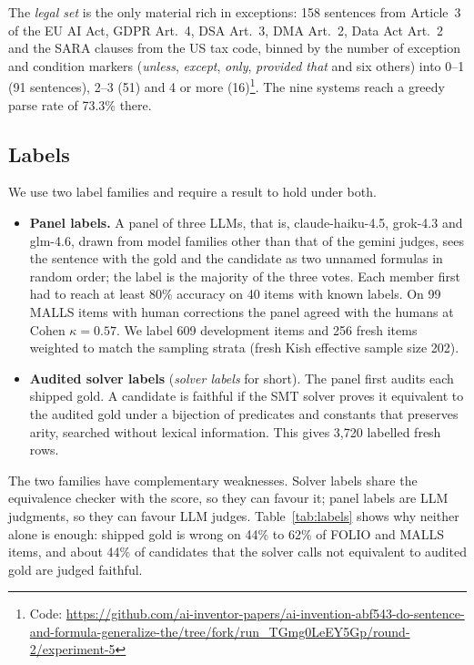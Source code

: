 \documentclass[11pt,letterpaper]{article}
\begin{document}
The \emph{legal set} is the only material rich in exceptions: 158 sentences from Article~3 of the EU AI Act, GDPR Art.~4, DSA Art.~3, DMA Art.~2, Data Act Art.~2 and the SARA clauses from the US tax code, binned by the number of exception and condition markers (\emph{unless}, \emph{except}, \emph{only}, \emph{provided that} and six others) into 0--1 (91 sentences), 2--3 (51) and 4 or more (16)\footnote{Code: \url{https://github.com/ai-inventor-papers/ai-invention-abf543-do-sentence-and-formula-generalize-the/tree/fork/run_TGmg0LeEY5Gp/round-2/experiment-5}}. The nine systems reach a greedy parse rate of 73.3\% there.

\subsection{Labels}

We use two label families and require a result to hold under both.
\begin{itemize}
  \item \textbf{Panel labels.} A panel of three LLMs, that is, claude-haiku-4.5, grok-4.3 and glm-4.6, drawn from model families other than that of the gemini judges, sees the sentence with the gold and the candidate as two unnamed formulas in random order; the label is the majority of the three votes. Each member first had to reach at least 80\% accuracy on 40 items with known labels. On 99 MALLS items with human corrections the panel agreed with the humans at Cohen $\kappa = 0.57$. We label 609 development items and 256 fresh items weighted to match the sampling strata (fresh Kish effective sample size 202).
  \item \textbf{Audited solver labels} (\emph{solver labels} for short). The panel first audits each shipped gold. A candidate is faithful if the SMT solver proves it equivalent to the audited gold under a bijection of predicates and constants that preserves arity, searched without lexical information. This gives 3,720 labelled fresh rows.
\end{itemize}

The two families have complementary weaknesses. Solver labels share the equivalence checker with the score, so they can favour it; panel labels are LLM judgments, so they can favour LLM judges. Table~\ref{tab:labels} shows why neither alone is enough: shipped gold is wrong on 44\% to 62\% of FOLIO and MALLS items, and about 44\% of candidates that the solver calls not equivalent to audited gold are judged faithful.
\end{document}
